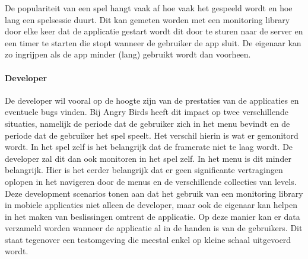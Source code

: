 De populariteit van een spel hangt vaak af hoe vaak het gespeeld wordt en hoe lang een spelsessie duurt. Dit kan gemeten worden met een monitoring library door elke keer dat de applicatie gestart wordt dit door te sturen naar de server en een timer te starten die stopt wanneer de gebruiker de app sluit. De eigenaar kan zo ingrijpen als de app minder (lang) gebruikt wordt dan voorheen. \\

\paragraph{Developer}
De developer wil vooral op de hoogte zijn van de prestaties van de applicaties en eventuele bugs vinden. Bij Angry Birds heeft dit impact op twee verschillende situaties, namelijk de periode dat de gebruiker zich in het menu bevindt en de periode dat de gebruiker het spel speelt. Het verschil hierin is wat er gemonitord wordt. In het spel zelf is het belangrijk dat de framerate niet te laag wordt. De developer zal dit dan ook monitoren in het spel zelf. In het menu is dit minder belangrijk. Hier is het eerder belangrijk dat er geen significante vertragingen oplopen in het navigeren door de menus en de verschillende collecties van levels.\\


Deze development scenarios tonen aan dat het gebruik van een monitoring library in mobiele applicaties niet alleen de developer, maar ook de eigenaar kan helpen in het maken van beslissingen omtrent de applicatie. Op deze manier kan er data verzameld worden wanneer de applicatie al in de handen is van de gebruikers. Dit staat tegenover een testomgeving die meestal enkel op kleine schaal uitgevoerd wordt.






